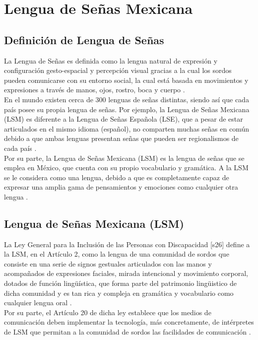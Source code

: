 \newpage
\section{Lengua de Señas Mexicana}
\subsection{Definición de Lengua de Señas}
La Lengua de Señas es definida como la lengua natural de expresión y configuración gesto-espacial y percepción visual gracias a la cual los sordos pueden comunicarse con su entorno social, la cual está basada en movimientos y expresiones a través de manos, ojos, rostro, boca y cuerpo \cite{ref33}.\\

En el mundo existen cerca de 300 lenguas de señas distintas, siendo así que cada país posee su propia lengua de señas. Por ejemplo, la Lengua de Señas Mexicana (LSM) es diferente a la Lengua de Señas Española (LSE), que a pesar de estar articulados en el mismo idioma (español), no comparten muchas señas en común debido a que ambas lenguas presentan señas que pueden ser regionalismos de cada país \cite{ref33}.\\

Por su parte, la Lengua de Señas Mexicana (LSM) es la lengua de señas que se emplea en México, que cuenta con su propio vocabulario y gramática. A la LSM se le considera como una lengua, debido a que es completamente capaz de expresar una amplia gama de pensamientos y emociones como cualquier otra lengua \cite{ref33}.

\subsection{Lengua de Señas Mexicana (LSM)}
La Ley General para la Inclusión de las Personas con Discapacidad [s26] define a la LSM, en el Artículo 2, como la lengua de una comunidad de sordos que consiste en una serie de signos gestuales articulados con las manos y acompañados de expresiones faciales, mirada intencional y movimiento corporal, dotados de función lingüística, que forma parte del patrimonio lingüistico de dicha comunidad y es tan rica y compleja en gramática y vocabulario como cualquier lengua oral \cite{ref34}.\\

Por su parte, el Artículo 20 de dicha ley establece que los medios de comunicación deben implementar la tecnología, más concretamente, de intérpretes de LSM que permitan a la comunidad de sordos las facilidades de comunicación \cite{ref34}.\\

